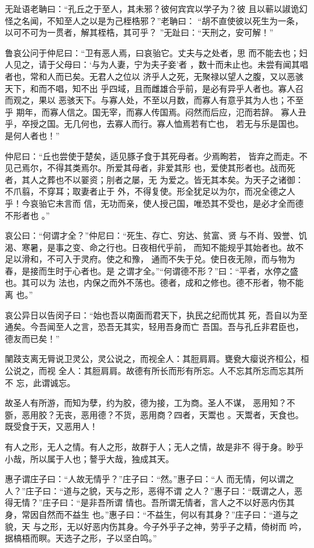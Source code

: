 \documentclass[12pt,UTF8]{ctexbook}
\begin{document}
无趾语老聃曰：“孔丘之于至人，其未邪？彼何宾宾以学子为？彼 且以蕲以諔诡幻怪之名闻，不知至人之以是为己桎梏邪？”老聃曰： “胡不直使彼以死生为一条，以可不可为一贯者，解其桎梏，其可乎？ ”无趾曰：“天刑之，安可解！”

鲁哀公问于仲尼曰：“卫有恶人焉，曰哀骀它。丈夫与之处者，思 而不能去也；妇人见之，请于父母曰：‘与为人妻，宁为夫子妾’者 ，数十而未止也。未尝有闻其唱者也，常和人而已矣。无君人之位以 济乎人之死，无聚禄以望人之腹，又以恶骇天下，和而不唱，知不出 乎四域，且而雌雄合乎前，是必有异乎人者也。寡人召而观之，果以 恶骇天下。与寡人处，不至以月数，而寡人有意乎其为人也；不至乎 期年，而寡人信之。国无宰，而寡人传国焉。闷然而后应，氾而若辞。 寡人丑乎，卒授之国。无几何也，去寡人而行。寡人恤焉若有亡也， 若无与乐是国也。是何人者也！”

仲尼曰：“丘也尝使于楚矣，适见豚子食于其死母者。少焉眴若， 皆弃之而走。不见己焉尔，不得其类焉尔。所爱其母者，非爱其形 也，爱使其形者也。战而死者，其人之葬也不以翣资；刖者之屡，无 为爱之。皆无其本矣。为天子之诸御：不爪翦，不穿耳；取妻者止于 外，不得复使。形全犹足以为尔，而况全德之人乎！今哀骀它未言而 信，无功而亲，使人授己国，唯恐其不受也，是必才全而德不形者也 。”

哀公曰：“何谓才全？”仲尼曰：“死生、存亡、穷达、贫富、贤 与不肖、毁誉、饥渴、寒暑，是事之变、命之行也。日夜相代乎前， 而知不能规乎其始者也。故不足以滑和，不可入于灵府。使之和豫， 通而不失于兑。使日夜无隙，而与物为春，是接而生时于心者也。是 之谓才全。”“何谓德不形？”曰：“平者，水停之盛也。其可以为 法也，内保之而外不荡也。德者，成和之修也。德不形者，物不能离 也。”

哀公异日以告闵子曰：“始也吾以南面而君天下，执民之纪而忧其 死，吾自以为至通矣。今吾闻至人之言，恐吾无其实，轻用吾身而亡 吾国。吾与孔丘非君臣也，德友而已矣！”

闉跂支离无脣说卫灵公，灵公说之，而视全人：其脰肩肩。甕㼜大瘿说齐桓公，桓公说之，而视 全人：其脰肩肩。故德有所长而形有所忘。人不忘其所忘而忘其所不 忘，此谓诚忘。

故圣人有所游，而知为孽，约为胶，德为接，工为商。圣人不谋， 恶用知？不斵，恶用胶？无丧，恶用德？不货，恶用商？四者，天鬻也 。天鬻者，天食也。既受食于天，又恶用人！

有人之形，无人之情。有人之形，故群于人；无人之情，故是非不 得于身。眇乎小哉，所以属于人也；謷乎大哉，独成其天。

惠子谓庄子曰：“人故无情乎？”庄子曰：“然。”惠子曰：“人 而无情，何以谓之人？”庄子曰：“道与之貌，天与之形，恶得不谓 之人？”惠子曰：“既谓之人，恶得无情？”庄子曰：“是非吾所谓 情也。吾所谓无情者，言人之不以好恶内伤其身，常因自然而不益生 也。”惠子曰：“不益生，何以有其身？”庄子曰：“道与之貌，天 与之形，无以好恶内伤其身。今子外乎子之神，劳乎子之精，倚树而 吟，据槁梧而瞑。天选子之形，子以坚白鸣。”
\end{document}
